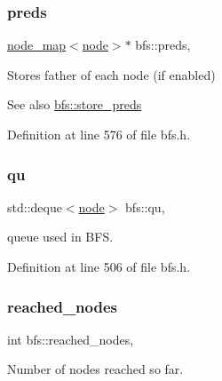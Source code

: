 \subsubsection{\texorpdfstring{preds}{preds}}
{\footnotesize\ttfamily \mbox{\hyperlink{classnode__map}{node\+\_\+map}}$<$\mbox{\hyperlink{classnode}{node}}$>$$\ast$ bfs\+::preds\hspace{0.3cm}{\ttfamily [protected]}, {\ttfamily [inherited]}}



Stores father of each node (if enabled) 

\begin{DoxySeeAlso}{See also}
\mbox{\hyperlink{classbfs_a8c7ce0ea2cd8e1932d1da5693d90cf61}{bfs\+::store\+\_\+preds}} 
\end{DoxySeeAlso}


Definition at line 576 of file bfs.\+h.

\mbox{\label{classbfs_ad2ef1030dcc16a1056e6ef6dfc3f1b6b}} 
\subsubsection{\texorpdfstring{qu}{qu}}
{\footnotesize\ttfamily std\+::deque$<$\mbox{\hyperlink{classnode}{node}}$>$ bfs\+::qu\hspace{0.3cm}{\ttfamily [protected]}, {\ttfamily [inherited]}}



queue used in B\+FS. 



Definition at line 506 of file bfs.\+h.

\mbox{\label{classbfs_ac3db80b59d5db049199936445a6c2da8}} 
\subsubsection{\texorpdfstring{reached\+\_\+nodes}{reached\_nodes}}
{\footnotesize\ttfamily int bfs\+::reached\+\_\+nodes\hspace{0.3cm}{\ttfamily [protected]}, {\ttfamily [inherited]}}



Number of nodes reached so far. 



